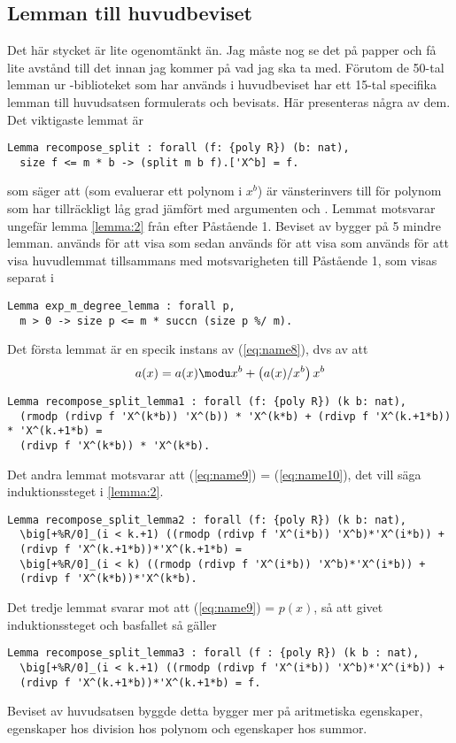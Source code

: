 \subsection{Lemman till huvudbeviset}
Det här stycket är lite ogenomtänkt än. Jag måste nog se det på papper och få
lite avstånd till det innan jag kommer på vad jag ska ta med. Förutom de 50-tal
lemman ur \ssr-biblioteket som har används i huvudbeviset har ett 15-tal
specifika lemman till huvudsatsen formulerats och bevisats. Här presenteras
några av dem. Det viktigaste lemmat är
\begin{lstlisting}
Lemma recompose_split : forall (f: {poly R}) (b: nat),
  size f <= m * b -> (split m b f).['X^b] = f.
\end{lstlisting}
som säger att  (som evaluerar ett polynom i $x^b$) är
vänsterinvers till  för polynom som har tillräckligt låg grad jämfört
med argumenten  och . Lemmat motsvarar ungefär lemma \ref{lemma:2}
från efter Påstående 1. Beviset av  bygger på 5 mindre
lemman.  används för att visa
 som sedan används för att visa
 som används för att visa huvudlemmat tillsammans med
motsvarigheten till Påstående 1, som visas separat i
\begin{lstlisting}
Lemma exp_m_degree_lemma : forall p,
  m > 0 -> size p <= m * succn (size p %/ m).
\end{lstlisting}
Det första lemmat är en specik instans av (\ref{eq:name8}), dvs av att
\begin{align}
  a(x)= a(x)  \modu x^b + \left(a(x)/x^b\right) x^b \label{eq:name8}
\end{align}
\begin{lstlisting}
Lemma recompose_split_lemma1 : forall (f: {poly R}) (k b: nat),
  (rmodp (rdivp f 'X^(k*b)) 'X^(b)) * 'X^(k*b) + (rdivp f 'X^(k.+1*b)) * 'X^(k.+1*b) =
  (rdivp f 'X^(k*b)) * 'X^(k*b).
\end{lstlisting}
Det andra lemmat motsvarar att (\ref{eq:name9}) = (\ref{eq:name10}), det vill
säga induktionssteget
i \ref{lemma:2}.
\begin{lstlisting}
Lemma recompose_split_lemma2 : forall (f: {poly R}) (k b: nat),
  \big[+%R/0]_(i < k.+1) ((rmodp (rdivp f 'X^(i*b)) 'X^b)*'X^(i*b)) +
  (rdivp f 'X^(k.+1*b))*'X^(k.+1*b) =
  \big[+%R/0]_(i < k) ((rmodp (rdivp f 'X^(i*b)) 'X^b)*'X^(i*b)) +
  (rdivp f 'X^(k*b))*'X^(k*b).
\end{lstlisting}
Det tredje lemmat svarar mot att (\ref{eq:name9}) = $p(x)$, så att givet
induktionssteget  och basfallet
 så gäller
\begin{lstlisting}
Lemma recompose_split_lemma3 : forall (f : {poly R}) (k b : nat),
  \big[+%R/0]_(i < k.+1) ((rmodp (rdivp f 'X^(i*b)) 'X^b)*'X^(i*b)) +
  (rdivp f 'X^(k.+1*b))*'X^(k.+1*b) = f.
\end{lstlisting}
Beviset av huvudsatsen byggde detta bygger mer på aritmetiska egenskaper,
egenskaper hos division hos polynom och egenskaper hos summor.

